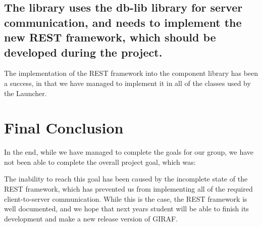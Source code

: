 \subsection*{The library uses the db-lib library for server communication, and
needs to implement the new REST framework, which should be developed during the
project.}
The implementation of the REST framework into the component library has been a
success, in that we have managed to implement it in all of the classes used by
the Launcher.

\section{Final Conclusion}
In the end, while we have managed to complete the goals for our group, we have
not been able to complete the overall project goal, which was:\nl

\nl

The inability to reach this goal has been caused by the incomplete state of the
REST framework, which has prevented us from implementing all of the required
client-to-server communication. While this is the case, the REST framework is
well documented, and we hope that next years student will be able to finish
its development and make a new release version of GIRAF. 


